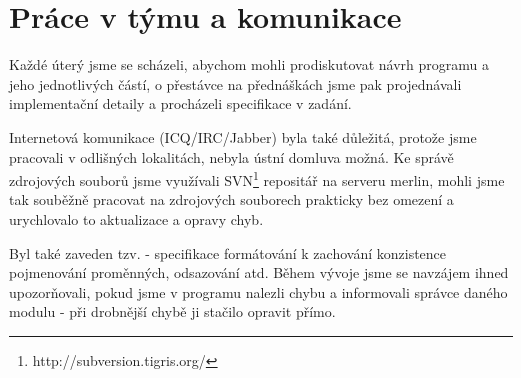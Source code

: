 \section{Práce v týmu a komunikace}

Každé úterý jsme se scházeli, abychom mohli prodiskutovat návrh programu a jeho jednotlivých částí, o přestávce na přednáškách jsme pak projednávali implementační detaily a procházeli specifikace v zadání.

Internetová komunikace (ICQ/IRC/Jabber) byla také důležitá, protože jsme pracovali v odlišných lokalitách, nebyla ústní domluva možná. Ke správě zdrojových souborů jsme využívali SVN\footnote{http://subversion.tigris.org/} repositář na serveru merlin, mohli jsme tak souběžně pracovat na zdrojových souborech prakticky bez omezení a urychlovalo to aktualizace a opravy chyb.

Byl také zaveden tzv.  - specifikace formátování k zachování konzistence pojmenování proměnných, odsazování atd. Během vývoje jsme se navzájem ihned upozorňovali, pokud jsme v programu nalezli chybu a informovali správce daného modulu - při drobnější chybě ji stačilo opravit přímo.
